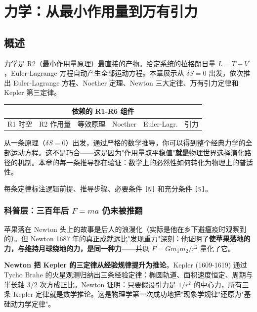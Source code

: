 \chapter{力学：从最小作用量到万有引力}
\label{ch:mechanics}

\section{概述}

力学是 R2（最小作用量原理）最直接的产物。给定系统的拉格朗日量 $L = T - V$，Euler-Lagrange 方程自动产生全部运动方程。本章展示从 $\delta S = 0$ 出发，依次推出 Euler-Lagrange 方程、Noether 定理、Newton 三大定律、万有引力定律和 Kepler 第三定律。

\begin{center}
\small
\begin{tabular}{p{2.2cm}p{1.5cm}p{1.5cm}p{1.5cm}p{1.5cm}p{1.5cm}}
\toprule
\multicolumn{6}{c}{\textbf{依赖的 R1-R6 组件}} \\
\midrule
R1 时空 & R2 作用量 & 等效原理 & Noether & Euler-Lagr. & 引力 \\
\bottomrule
\end{tabular}
\end{center}

\begin{insightbox}[本章的核心启示]
  从一条原理（$\delta S = 0$）出发，通过严格的数学推导，你可以得到整个经典力学的全部运动方程。这不是巧合——这是因为"作用量取平稳值"\textbf{就是}物理世界选择演化路径的机制。本章的每一条推导都在验证：数学上的必然性如何转化为物理上的普适性。
\end{insightbox}

每条定律标注逻辑前提、推导步骤、必要条件 \texttt{[N]} 和充分条件 \texttt{[S]}。

\subsection{科普层：三百年后 $F = ma$ 仍未被推翻}

苹果落在 Newton 头上的故事是后人的浪漫化（实际是他在乡下避瘟疫时观察到的）。但 Newton 1687 年的真正成就远比"发现重力"深刻：他证明了\textbf{使苹果落地的力，与维持月球绕地的力，是同一种力}——并以 $F = G m_1 m_2 / r^2$ 量化了它。

\textbf{Newton 把 Kepler 的三定律从经验规律提升为推论}。Kepler (1609-1619) 通过 Tycho Brahe 的火星观测归纳出三条经验定律：椭圆轨道、面积速度恒定、周期与半长轴 3/2 次方成正比。Newton 证明：只要假设引力是 $1/r^2$ 的中心力，所有三条 Kepler 定律就是数学推论。这是物理学第一次成功地把"现象学规律"还原为"基础动力学定律"。

